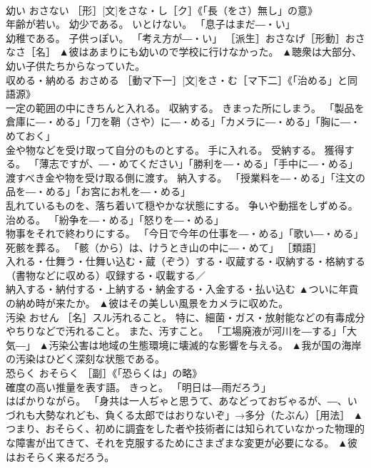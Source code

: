\documentclass[8pt]{extreport}
\begin{document}
\begin{CJK}{UTF8}{min}
\\	幼い	おさない	［形］[文]をさな・し［ク］《「長（をさ）無し」の意》 
\\	年齢が若い。 幼少である。 いとけない。 「息子はまだ―・い」 
\\	幼稚である。 子供っぽい。 「考え方が―・い」 ［派生］おさなげ［形動］おさなさ［名］	▲彼はあまりにも幼いので学校に行けなかった。 ▲聴衆は大部分、幼い子供たちからなっていた。
\\	収める・納める	おさめる	［動マ下一］[文]をさ・む［マ下二］《「治める」と同語源》 
\\	一定の範囲の中にきちんと入れる。 収納する。 きまった所にしまう。 「製品を倉庫に―・める」「刀を鞘（さや）に―・める」「カメラに―・める」「胸に―・めておく」 
\\	金や物などを受け取って自分のものとする。 手に入れる。 受納する。 獲得する。 「薄志ですが、―・めてください」「勝利を―・める」「手中に―・める」 
\\	渡すべき金や物を受け取る側に渡す。 納入する。 「授業料を―・める」「注文の品を―・める」「お宮にお札を―・める」 
\\	乱れているものを、落ち着いて穏やかな状態にする。 争いや動揺をしずめる。 治める。 「紛争を―・める」「怒りを―・める」 
\\	物事をそれで終わりにする。 「今日で今年の仕事を―・める」「歌い―・める」 
\\	死骸を葬る。 「骸（から）は、けうとき山の中に―・めて」 ［類語］
\\	入れる・仕舞う・仕舞い込む・蔵（ぞう）する・収蔵する・収納する・格納する（書物などに収める）収録する・収載する／
\\	納入する・納付する・上納する・納金する・入金する・払い込む	▲ついに年貢の納め時が来たか。 ▲彼はその美しい風景をカメラに収めた。
\\	汚染	おせん	［名］スル汚れること。 特に、細菌・ガス・放射能などの有毒成分やちりなどで汚れること。 また、汚すこと。 「工場廃液が河川を―する」「大気―」	▲汚染公害は地域の生態環境に壊滅的な影響を与える。 ▲我が国の海岸の汚染はひどく深刻な状態である。
\\	恐らく	おそらく	［副］《「恐らくは」の略》 
\\	確度の高い推量を表す語。 きっと。 「明日は―雨だろう」 
\\	はばかりながら。 「身共は一人ぢゃと思うて、あなどっておぢゃるが、―、いづれも大勢なれども、負くる太郎ではおりないぞ」→多分（たぶん）［用法］	▲つまり、おそらく、初めに調査をした者や技術者には知られていなかった物理的な障害が出てきて、それを克服するためにさまざまな変更が必要になる。 ▲彼はおそらく来るだろう。

\end{CJK}
\end{document}
